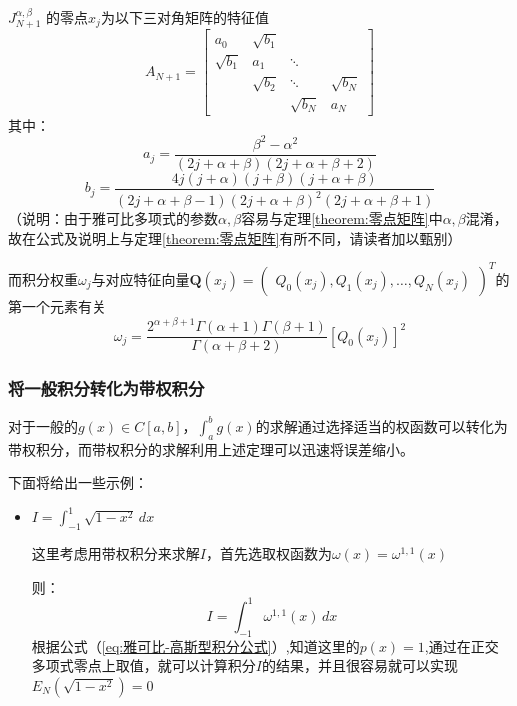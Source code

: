 \documentclass[12pt]{ctexart}
\numberwithin{equation}{section} %
\begin{document}
$J_{N+1}^{\alpha,\beta}$
的零点$x_j$为以下三对角矩阵的特征值\\
\begin{equation}
    A_{N+1}=
    \begin{bmatrix}
        a_0&\sqrt{b_1}&&\\
        \sqrt{b_1}&a_1&\ddots&\\
        &\sqrt{b_2}&\ddots&\sqrt{b_N}\\
        &&\sqrt{b_N}&a_N
    \end{bmatrix}
\end{equation}
其中：
\begin{equation*}
    a_j=\frac{\beta^2-\alpha^2}{(2j+\alpha+\beta)(2j+\alpha+\beta+2)}
\end{equation*}
\begin{equation*}
    b_j=\frac{4j(j+\alpha)(j+\beta)(j+\alpha+\beta)}{(2j+\alpha+\beta-1)(2j+\alpha+\beta)^2(2j+\alpha+\beta+1)}
\end{equation*}
（说明：由于雅可比多项式的参数$\alpha,\beta$容易与定理\ref{theorem:零点矩阵}中$\alpha,\beta$混淆，故在公式及说明上与定理\ref{theorem:零点矩阵}有所不同，请读者加以甄别）

而积分权重$\omega_j$与对应特征向量$ \mathbf{Q}(x_j)=\begin{pmatrix}Q_0(x_j),Q_1(x_j),\ldots,Q_N(x_j)\end{pmatrix}^T$的第一个元素有关
\begin{equation}
    \omega_j=\frac{2^{\alpha+\beta+1}\Gamma(\alpha+1)\Gamma(\beta+1)}{\Gamma(\alpha+\beta+2)}[Q_0(x_j)]^2
\end{equation}
\subsubsection{将一般积分转化为带权积分}
对于一般的$g(x)\in C[a,b]$，$\int_a^b g(x)$的求解通过选择适当的权函数可以转化为带权积分，而带权积分的求解利用上述定理可以迅速将误差缩小。

下面将给出一些示例：
\begin{itemize}
    \item  $I = \int_{-1}^{1} \sqrt{1-x^2} \, dx$

    这里考虑用带权积分来求解$I$，首先选取权函数为$\omega(x)=\omega^{1,1}(x)$
    
    则：
    $$I=\int_{-1}^{1} \omega^{1,1}(x)\, dx$$
    根据公式（\ref{eq:雅可比-高斯型积分公式}）,知道这里的$p(x)=1$,通过在正交多项式零点上取值，就可以计算积分$I$的结果，并且很容易就可以实现$E_N(\sqrt{1-x^2})=0$

\end{itemize}
\end{document}
